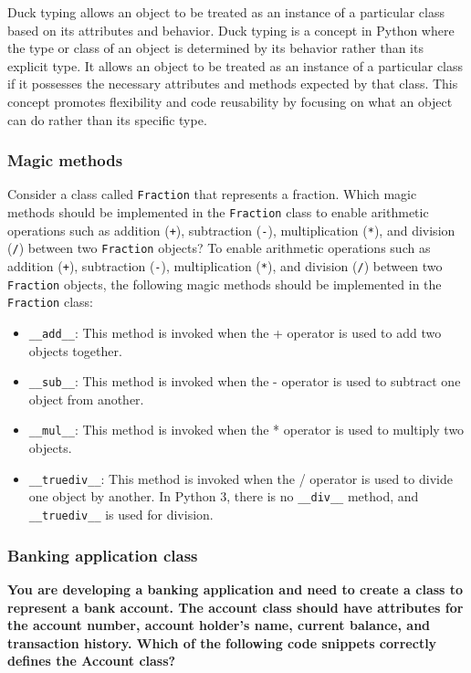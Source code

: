 Duck typing allows an object to be treated as an instance of a particular class based on its attributes and behavior. Duck typing is a concept in Python where the type or class of an object is determined by its behavior rather than its explicit type. It allows an object to be treated as an instance of a particular class if it possesses the necessary attributes and methods expected by that class. This concept promotes flexibility and code reusability by focusing on what an object can do rather than its specific type.

\newpage
\subsubsection{Magic methods}
Consider a class called \texttt{Fraction} that represents a fraction. Which magic methods should be implemented in the \texttt{Fraction} class to enable arithmetic operations such as addition (\texttt{+}), subtraction (\texttt{-}), multiplication (\texttt{*}), and division (\texttt{/}) between two \texttt{Fraction} objects?
To enable arithmetic operations such as addition (\texttt{+}), subtraction (\texttt{-}), multiplication (\texttt{*}), and division (\texttt{/}) between two \texttt{Fraction} objects, the following magic methods should be implemented in the \texttt{Fraction} class:

\begin{itemize}
    \item \texttt{\_\_add\_\_}: This method is invoked when the + operator is used to add two objects together.
    \item \texttt{\_\_sub\_\_}: This method is invoked when the - operator is used to subtract one object from another.
    \item \texttt{\_\_mul\_\_}: This method is invoked when the * operator is used to multiply two objects.
    \item \texttt{\_\_truediv\_\_}: This method is invoked when the / operator is used to divide one object by another. In Python 3, there is no \texttt{\_\_div\_\_} method, and \texttt{\_\_truediv\_\_} is used for division.
\end{itemize}

\subsubsection{Banking application class}
\textbf{You are developing a banking application and need to create a class to represent a bank account. The account class should have attributes for the account number, account holder's name, current balance, and transaction history. Which of the following code snippets correctly defines the Account class?}

